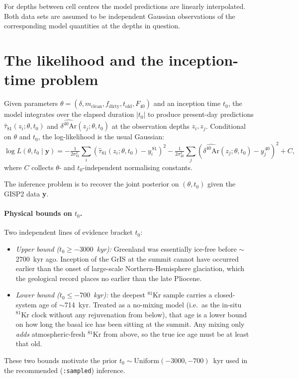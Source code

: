 \documentclass[11pt,a4paper]{article}
\newcommand{\Kr}{\ensuremath{{}^{81}\mathrm{Kr}}}
\newcommand{\tzero}{\ensuremath{t_{0}}}
\newcommand{\told}{\ensuremath{t_{\mathrm{old}}}}
\newcommand{\code}[1]{\texttt{#1}}
\begin{document}
For depths between cell centres the model predictions are linearly
interpolated. Both data sets are assumed to be independent Gaussian
observations of the corresponding model quantities at the depths in question.

\section{The likelihood and the inception-time problem}
\label{sec:tzero}

Given parameters $\theta = (\delta, m_{\mathrm{clean}}, f_{\mathrm{dirty}},
\told, F_{40})$ and an inception time \tzero{}, the model integrates over
the elapsed duration $|\tzero|$ to produce present-day predictions
$\hat{\tau}_{81}(z_i;\theta,\tzero)$ and
$\widehat{\delta^{40}\mathrm{Ar}}(z_j;\theta,\tzero)$ at the observation
depths $z_i, z_j$. Conditional on $\theta$ and \tzero{}, the log-likelihood
is the usual Gaussian:
\begin{equation}
\log L(\theta, \tzero \mid \mathbf{y}) = -\tfrac{1}{2\sigma_{81}^2}\sum_{i}\!\left(\hat{\tau}_{81}(z_i;\theta,\tzero) - y_i^{\,81}\right)^{2}
- \tfrac{1}{2\sigma_{40}^2}\sum_{j}\!\left(\widehat{\delta^{40}\mathrm{Ar}}(z_j;\theta,\tzero) - y_j^{\,40}\right)^{2} + C,
\label{eq:loglik}
\end{equation}
where $C$ collects $\theta$- and \tzero{}-independent normalising constants.

The inference problem is to recover the joint posterior on $(\theta,
\tzero)$ given the GISP2 data \textbf{y}.

\paragraph{Physical bounds on \tzero{}.}
Two independent lines of evidence bracket \tzero{}:
\begin{itemize}
  \item \emph{Upper bound ($\tzero \geq -3000$~kyr):} Greenland was
        essentially ice-free before $\sim$2700~kyr ago. Inception of the
        GrIS at the summit cannot have occurred earlier than the onset of
        large-scale Northern-Hemisphere glaciation, which the geological
        record places no earlier than the late Pliocene.
  \item \emph{Lower bound ($\tzero \leq -700$~kyr):} the deepest \Kr{}
        sample carries a closed-system age of $\sim$714~kyr. Treated as a
        no-mixing model (i.e.\ as the in-situ \Kr{} clock without any
        rejuvenation from below), that age is a lower bound on how long the
        basal ice has been sitting at the summit. Any mixing only \emph{adds}
        atmospheric-fresh \Kr{} from above, so the true ice age must be at
        least that old.
\end{itemize}
These two bounds motivate the prior $\tzero \sim \mathrm{Uniform}(-3000,
-700)$~kyr used in the recommended (\code{:sampled}) inference.
\end{document}

